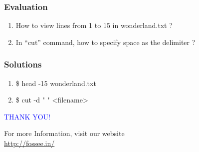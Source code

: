 \documentclass[12pt,compress]{beamer}
\begin{document}
\begin{frame}[fragile]
\frametitle{Evaluation}
\label{sec-9}


\begin{enumerate}
\item How to view lines from 1 to 15 in wonderland.txt ?
\vspace{15pt}
\item In ``cut'' command, how to specify space as the delimiter ? 
\end{enumerate}
\end{frame}
\begin{frame}
\frametitle{Solutions}
\label{sec-10}


\begin{enumerate}
\item \$ head -15 wonderland.txt
\vspace{15pt}
\item \$ cut -d " " <filename>
\end{enumerate}
\end{frame}
\begin{frame}

  \begin{block}{}
  \begin{center}
  \textcolor{blue}{\Large THANK YOU!} 
  \end{center}
  \end{block}
\begin{block}{}
  \begin{center}
    For more Information, visit our website\\
    \url{http://fossee.in/}
  \end{center}  
  \end{block}
\end{frame}
\end{document}
